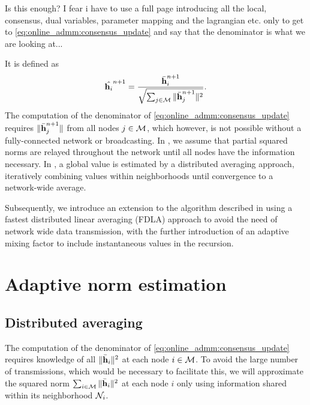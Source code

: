 \documentclass{article}
\begin{document}
\begin{todo}
    Is this enough? I fear i have to use a full page introducing all the local, consensus, dual variables, parameter mapping and the lagrangian etc. only to get to \eqref{eq:online_admm:consensus_update} and say that the denominator is what we are looking at...
\end{todo}
It is defined as
\begin{equation}
    \hat{\bm{\mathrm{h}}_i}^{n+1} = \frac{\bar{\bm{\mathrm{h}}}_i^{n+1}}{\sqrt{\sum_{j \in \mathcal{M}} \|\bar{\bm{\mathrm{h}}}_j^{n+1}\|^2}}.\label{eq:online_admm:consensus_update}
\end{equation}
The computation of the denominator of \eqref{eq:online_admm:consensus_update} requires  \(\|\bar{\bm{\mathrm{h}}}_j^{n+1}\|\) from all nodes \(j \in \mathcal{M}\), which however, is not possible without a fully-connected network or broadcasting.
In \cite{blochbergerDBSI}, we assume that partial squared norms are relayed throughout the network until all nodes have the information necessary.
In \cite{yuDistributedBlindSystem2014,liuDistributedBlindIdentification2016}, a global value is estimated by a distributed averaging approach, iteratively combining values within neighborhoods until convergence to a network-wide average.

Subsequently, we introduce an extension to the algorithm described in \cite{blochbergerDBSI} using a fastest distributed linear averaging (FDLA) approach \cite{xiaoFastLinearIterations2004} to avoid the need of network wide data transmission, with the further introduction of an adaptive mixing factor to include instantaneous values in the recursion.

\section{Adaptive norm estimation}
\label{sec:adaptivenormest}

\subsection[]{Distributed averaging}
The computation of the denominator of \eqref{eq:online_admm:consensus_update} requires knowledge of all \(\|\bar{\bm{\mathrm{h}}}_i\|^2\) at each node \(i \in \mathcal{M}\).
To avoid the large number of transmissions, which would be necessary to facilitate this, we will approximate the squared norm \(\sum_{i \in \mathcal{M}} \|\bar{\bm{\mathrm{h}}}_i\|^2\) at each node \(i\) only using information shared within its neighborhood \(\mathcal{N}_i\).
\end{document}
